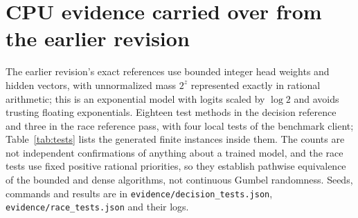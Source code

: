 \section{CPU evidence carried over from the earlier revision}\label{app:cpu}
The earlier revision's exact references use bounded integer head weights and hidden vectors, with unnormalized mass $2^z$ represented exactly in rational arithmetic; this is an exponential model with logits scaled by $\log2$ and avoids trusting floating exponentials. Eighteen test methods in the decision reference and three in the race reference pass, with four local tests of the benchmark client; Table~\ref{tab:tests} lists the generated finite instances inside them. The counts are not independent confirmations of anything about a trained model, and the race tests use fixed positive rational priorities, so they establish pathwise equivalence of the bounded and dense algorithms, not continuous Gumbel randomness. Seeds, commands and results are in \nolinkurl{evidence/decision_tests.json}, \nolinkurl{evidence/race_tests.json} and their logs.

